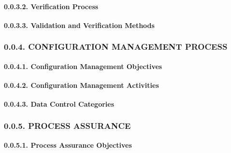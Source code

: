 \documentclass[
]{article}
\begin{document}
\hypertarget{verification-process}{%
\paragraph{0.0.3.2. Verification Process}\label{verification-process}}

\hypertarget{validation-and-verification-methods}{%
\paragraph{0.0.3.3. Validation and Verification
Methods}\label{validation-and-verification-methods}}

\hypertarget{configuration-management-process}{%
\subsubsection{0.0.4. CONFIGURATION MANAGEMENT
PROCESS}\label{configuration-management-process}}

\hypertarget{configuration-management-objectives}{%
\paragraph{0.0.4.1. Configuration Management
Objectives}\label{configuration-management-objectives}}

\hypertarget{configuration-management-activities}{%
\paragraph{0.0.4.2. Configuration Management
Activities}\label{configuration-management-activities}}

\hypertarget{data-control-categories}{%
\paragraph{0.0.4.3. Data Control
Categories}\label{data-control-categories}}

\hypertarget{process-assurance}{%
\subsubsection{0.0.5. PROCESS ASSURANCE}\label{process-assurance}}

\hypertarget{process-assurance-objectives}{%
\paragraph{0.0.5.1. Process Assurance
Objectives}\label{process-assurance-objectives}}
\end{document}
